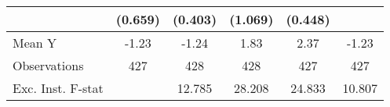 {\begin{tabular}{l*{5}{c}}
            &     (0.659)         &     (0.403)         &     (1.069)         &     (0.448)         &                     \\
\midrule
Mean Y      &       -1.23         &       -1.24         &        1.83         &        2.37         &       -1.23         \\
Observations&         427         &         428         &         428         &         427         &         427         \\
Exc. Inst. F-stat&                     &      12.785         &      28.208         &      24.833         &      10.807         \\
\bottomrule
\end{tabular}
}
